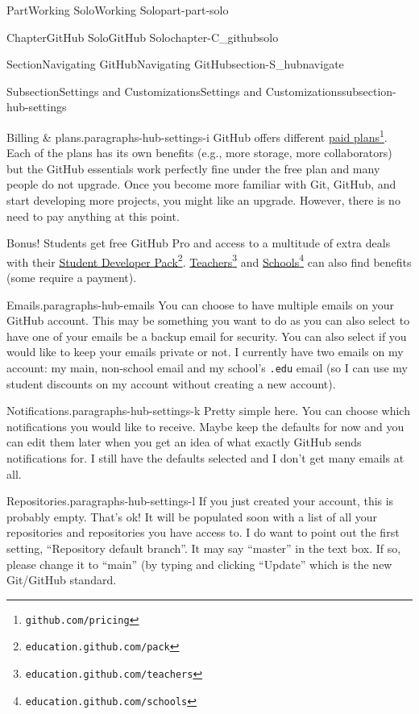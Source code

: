 \documentclass[oneside,10pt,]{book}
\newcommand{\mono}[1]{\texttt{#1}}
\begin{document}
\begin{partptx}{Part}{Working Solo}{}{Working Solo}{}{}{part-part-solo}
\begin{chapterptx}{Chapter}{GitHub Solo}{}{GitHub Solo}{}{}{chapter-C_githubsolo}
\begin{sectionptx}{Section}{Navigating GitHub}{}{Navigating GitHub}{}{}{section-S_hubnavigate}
\begin{subsectionptx}{Subsection}{Settings and Customizations}{}{Settings and Customizations}{}{}{subsection-hub-settings}
\begin{paragraphs}{Billing \& plans.}{paragraphs-hub-settings-i}
GitHub offers different \href{https://github.com/pricing}{paid plans}\footnote{\nolinkurl{github.com/pricing}\label{fn-hub-settings-i-c-b}}. Each of the plans has its own benefits (e.g., more storage, more collaborators) but the GitHub essentials work perfectly fine under the free plan and many people do not upgrade. Once you become more familiar with Git, GitHub, and start developing more projects, you might like an upgrade. However, there is no need to pay anything at this point.%
\par
Bonus! Students get free GitHub Pro and access to a multitude of extra deals with their \href{https://education.github.com/pack}{Student Developer Pack}\footnote{\nolinkurl{education.github.com/pack}\label{fn-hub-settings-i-d-b}}. \href{https://education.github.com/teachers}{Teachers}\footnote{\nolinkurl{education.github.com/teachers}\label{fn-hub-settings-i-d-d}} and \href{https://education.github.com/schools}{Schools}\footnote{\nolinkurl{education.github.com/schools}\label{fn-hub-settings-i-d-f}} can also find benefits (some require a payment).%
\end{paragraphs}%
\begin{paragraphs}{Emails.}{paragraphs-hub-emails}%
%
You can choose to have multiple emails on your GitHub account. This may be something you want to do as you can also select to have one of your emails be a backup email for security. You can also select if you would like to keep your emails private or not. I currently have two emails on my account: my main, non-school email and my school's \mono{.edu} email (so I can use my student discounts on my account without creating a new account).%
\end{paragraphs}%
\begin{paragraphs}{Notifications.}{paragraphs-hub-settings-k}%
%
Pretty simple here. You can choose which notifications you would like to receive. Maybe keep the defaults for now and you can edit them later when you get an idea of what exactly GitHub sends notifications for. I still have the defaults selected and I don't get many emails at all.%
\end{paragraphs}%
\begin{paragraphs}{Repositories.}{paragraphs-hub-settings-l}%
%
%
If you just created your account, this is probably empty. That's ok! It will be populated soon with a list of all your repositories and repositories you have access to. I do want to point out the first setting, ``Repository default branch''. It may say ``master'' in the text box. If so, please change it to ``main'' (by typing and clicking ``Update'' which is the new Git\slash{}GitHub standard.%

\end{paragraphs}
\end{subsectionptx}
\end{sectionptx}
\end{chapterptx}
\end{partptx}
\end{document}

